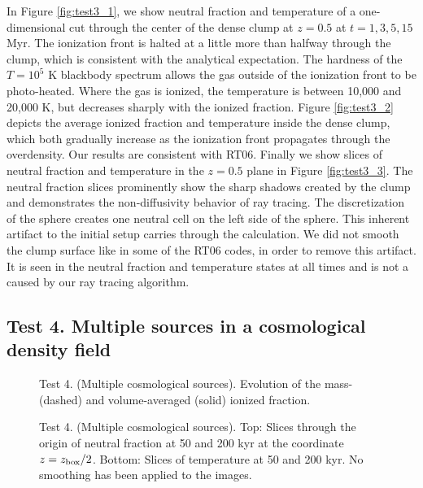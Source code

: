 \documentclass[useAMS,usenatbib,a4paper]{mn2e}
\begin{document}
In Figure \ref{fig:test3_1}, we show neutral fraction and temperature
of a one-dimensional cut through the center of the dense clump at $z =
0.5$ at $t = 1, 3, 5, 15$ Myr.  The ionization front is halted at a
little more than halfway through the clump, which is consistent with
the analytical expectation.  The hardness of the $T = 10^5$ K
blackbody spectrum allows the gas outside of the ionization front to
be photo-heated.  Where the gas is ionized, the temperature is between
10,000 and 20,000 K, but decreases sharply with the ionized fraction.
Figure \ref{fig:test3_2} depicts the average ionized fraction and
temperature inside the dense clump, which both gradually increase as
the ionization front propagates through the overdensity.  Our results
are consistent with RT06.  Finally we show slices of neutral fraction
and temperature in the $z = 0.5$ plane in Figure \ref{fig:test3_3}.
The neutral fraction slices prominently show the sharp shadows created
by the clump and demonstrates the non-diffusivity behavior of ray
tracing.  The discretization of the sphere creates one neutral cell on
the left side of the sphere.  This inherent artifact to the initial
setup carries through the calculation.  We did not smooth the clump
surface like in some of the RT06 codes, in order to remove this
artifact.  It is seen in the neutral fraction and temperature states
at all times and is not a caused by our ray tracing algorithm.

\subsection{Test 4. Multiple sources in a cosmological density field}

\begin{figure}
  \caption{\label{fig:test4_1} Test 4. (Multiple cosmological
    sources).  Evolution of the mass- (dashed) and volume-averaged
    (solid) ionized fraction.}
\end{figure}

\begin{figure*}
  \caption{\label{fig:test4_2} Test 4. (Multiple cosmological
    sources).  Top: Slices through the origin of neutral fraction at
    50 and 200 kyr at the coordinate $z = z_{\rm box}/2$.  Bottom:
    Slices of temperature at 50 and 200 kyr.  No smoothing has been
    applied to the images.}
\end{figure*}
\end{document}
